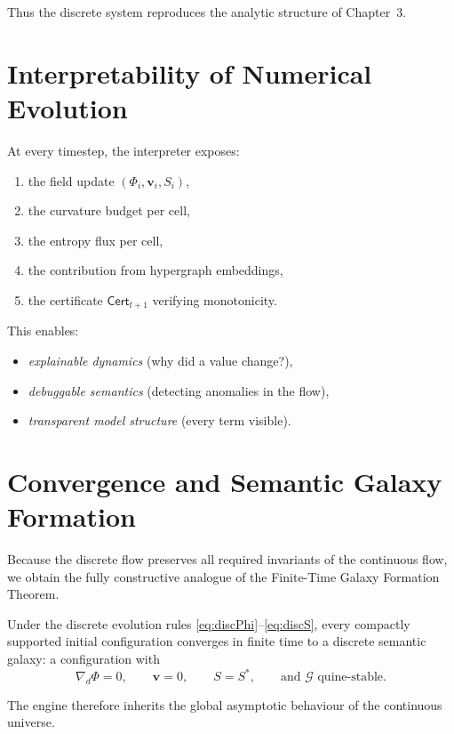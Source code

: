Thus the discrete system reproduces the analytic structure of Chapter~3.

\section{Interpretability of Numerical Evolution}

At every timestep, the interpreter exposes:

\begin{enumerate}
\item the field update $(\Phi_i,\mathbf{v}_i,S_i)$,
\item the curvature budget per cell,
\item the entropy flux per cell,
\item the contribution from hypergraph embeddings,
\item the certificate $\mathsf{Cert}_{t+1}$ verifying monotonicity.
\end{enumerate}

This enables:
\begin{itemize}
\item \emph{explainable dynamics} (why did a value change?),
\item \emph{debuggable semantics} (detecting anomalies in the flow),
\item \emph{transparent model structure} (every term visible).
\end{itemize}

\section{Convergence and Semantic Galaxy Formation}

Because the discrete flow preserves all required invariants of the
continuous flow, we obtain the fully constructive analogue of the
Finite-Time Galaxy Formation Theorem.

\begin{theorem}
Under the discrete evolution rules
\eqref{eq:discPhi}--\eqref{eq:discS}, every compactly supported
initial configuration converges in finite time to a discrete semantic
galaxy: a configuration with
\[
  \nabla_d \Phi = 0,\qquad
  \mathbf{v}=0,\qquad
  S = S^\ast,\qquad
  \text{and }\mathcal{G}\text{ quine-stable}.
\]
\end{theorem}

The engine therefore inherits the global asymptotic behaviour of the
continuous universe.

